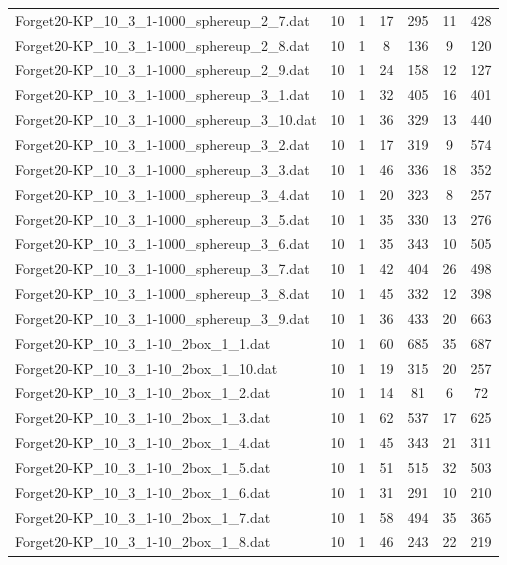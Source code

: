 \begin{table}[!ht]
\begin{tabular}{lcccccc}
Forget20-KP\_10\_3\_1-1000\_sphereup\_2\_7.dat & 10 & 1 & 17 & 295 & 11 & 428 \\
Forget20-KP\_10\_3\_1-1000\_sphereup\_2\_8.dat & 10 & 1 & 8 & 136 & 9 & 120 \\
Forget20-KP\_10\_3\_1-1000\_sphereup\_2\_9.dat & 10 & 1 & 24 & 158 & 12 & 127 \\
Forget20-KP\_10\_3\_1-1000\_sphereup\_3\_1.dat & 10 & 1 & 32 & 405 & 16 & 401 \\
Forget20-KP\_10\_3\_1-1000\_sphereup\_3\_10.dat & 10 & 1 & 36 & 329 & 13 & 440 \\
Forget20-KP\_10\_3\_1-1000\_sphereup\_3\_2.dat & 10 & 1 & 17 & 319 & 9 & 574 \\
Forget20-KP\_10\_3\_1-1000\_sphereup\_3\_3.dat & 10 & 1 & 46 & 336 & 18 & 352 \\
Forget20-KP\_10\_3\_1-1000\_sphereup\_3\_4.dat & 10 & 1 & 20 & 323 & 8 & 257 \\
Forget20-KP\_10\_3\_1-1000\_sphereup\_3\_5.dat & 10 & 1 & 35 & 330 & 13 & 276 \\
Forget20-KP\_10\_3\_1-1000\_sphereup\_3\_6.dat & 10 & 1 & 35 & 343 & 10 & 505 \\
Forget20-KP\_10\_3\_1-1000\_sphereup\_3\_7.dat & 10 & 1 & 42 & 404 & 26 & 498 \\
Forget20-KP\_10\_3\_1-1000\_sphereup\_3\_8.dat & 10 & 1 & 45 & 332 & 12 & 398 \\
Forget20-KP\_10\_3\_1-1000\_sphereup\_3\_9.dat & 10 & 1 & 36 & 433 & 20 & 663 \\
Forget20-KP\_10\_3\_1-10\_2box\_1\_1.dat & 10 & 1 & 60 & 685 & 35 & 687 \\
Forget20-KP\_10\_3\_1-10\_2box\_1\_10.dat & 10 & 1 & 19 & 315 & 20 & 257 \\
Forget20-KP\_10\_3\_1-10\_2box\_1\_2.dat & 10 & 1 & 14 & 81 & 6 & 72 \\
Forget20-KP\_10\_3\_1-10\_2box\_1\_3.dat & 10 & 1 & 62 & 537 & 17 & 625 \\
Forget20-KP\_10\_3\_1-10\_2box\_1\_4.dat & 10 & 1 & 45 & 343 & 21 & 311 \\
Forget20-KP\_10\_3\_1-10\_2box\_1\_5.dat & 10 & 1 & 51 & 515 & 32 & 503 \\
Forget20-KP\_10\_3\_1-10\_2box\_1\_6.dat & 10 & 1 & 31 & 291 & 10 & 210 \\
Forget20-KP\_10\_3\_1-10\_2box\_1\_7.dat & 10 & 1 & 58 & 494 & 35 & 365 \\
Forget20-KP\_10\_3\_1-10\_2box\_1\_8.dat & 10 & 1 & 46 & 243 & 22 & 219 \\

\end{tabular}
\end{table}
